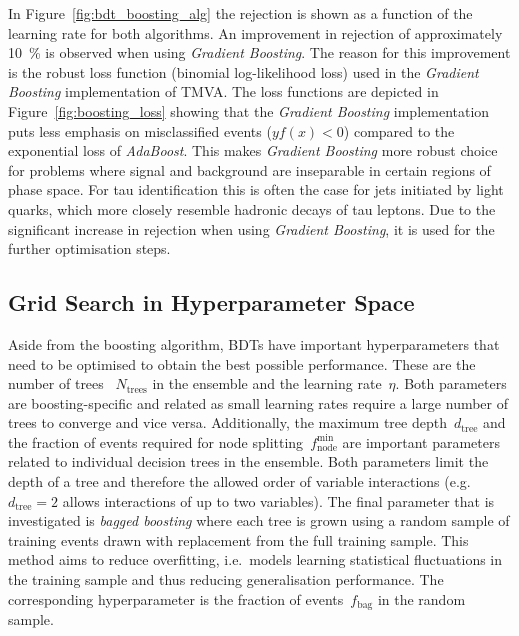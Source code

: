 In Figure~\ref{fig:bdt_boosting_alg} the rejection is shown as a function of the
learning rate for both algorithms. An improvement in rejection of approximately
\SI{10}{\percent} is observed when using \emph{Gradient Boosting}. The reason
for this improvement is the robust loss function (binomial log-likelihood loss)
used in the \emph{Gradient Boosting} implementation of TMVA. The loss functions
are depicted in Figure~\ref{fig:boosting_loss} showing that the \emph{Gradient
  Boosting} implementation puts less emphasis on misclassified events
($y f(x) < 0$) compared to the exponential loss of \emph{AdaBoost}. This makes
\emph{Gradient Boosting} more robust choice for problems where signal and
background are inseparable in certain regions of phase space. For tau
identification this is often the case for jets initiated by light quarks, which
more closely resemble hadronic decays of tau leptons. Due to the significant
increase in rejection when using \emph{Gradient Boosting}, it is used for the
further optimisation steps.

\subsection{Grid Search in Hyperparameter Space}
\label{sec:bdt_grid_search}

Aside from the boosting algorithm, BDTs have important hyperparameters that need
to be optimised to obtain the best possible performance. These are the number of
trees~ $N_\text{trees}$ in the ensemble and the learning rate~$\eta$. Both
parameters are boosting-specific and related as small learning rates require a
large number of trees to converge and vice versa. Additionally, the maximum tree
depth~$d_\text{tree}$ and the fraction of events required for node
splitting~$f_\text{node}^\text{min}$ are important parameters related to
individual decision trees in the ensemble. Both parameters limit the depth of a
tree and therefore the allowed order of variable interactions (e.g.\
$d_\text{tree} = 2$ allows interactions of up to two variables). The final
parameter that is investigated is \emph{bagged boosting} where each tree is
grown using a random sample of training events drawn with replacement from the
full training sample. This method aims to reduce overfitting, i.e.\ models
learning statistical fluctuations in the training sample and thus reducing
generalisation performance. The corresponding hyperparameter is the fraction of
events~$f_\text{bag}$ in the random sample.

